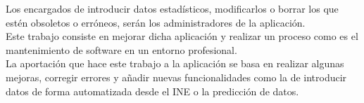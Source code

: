 Los encargados de introducir datos estadísticos, modificarlos o borrar los que estén obsoletos o erróneos, serán los administradores de la aplicación.\\
Este trabajo consiste en mejorar dicha aplicación y realizar un proceso como es el mantenimiento de software en un entorno profesional.\\ 
La aportación que hace este trabajo a la aplicación se basa en realizar algunas mejoras, corregir errores y añadir nuevas funcionalidades como la de introducir datos de forma automatizada desde el INE o la predicción de datos.\\


